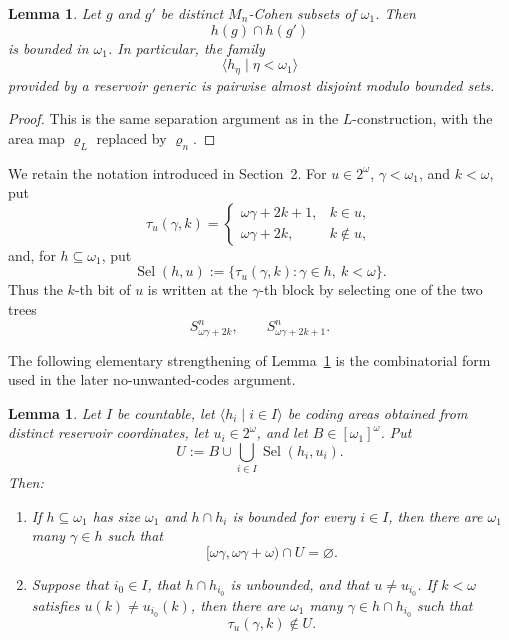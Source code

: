 \documentclass[a4paper,11pt]{article}
\newtheorem{lemma}[theorem]{Lemma}
\begin{document}
\begin{lemma}
\label{lemma-separation-Mn-coding-areas}
Let $g$ and $g'$ be distinct $M_n$-Cohen subsets of $\omega_1$.  Then
\[
   h(g)\cap h(g')
\]
is bounded in $\omega_1$.  In particular, the family
\[
   \langle h_\eta\mid\eta<\omega_1\rangle
\]
provided by a reservoir generic is pairwise almost disjoint modulo bounded
sets.
\end{lemma}


\begin{proof}
This is the same separation argument as in the $L$-construction, with the
area map $\varrho_L$ replaced by $\varrho_n$.  
\end{proof}

We retain the notation introduced in Section~2.  For $u\in2^\omega$,
$\gamma<\omega_1$, and $k<\omega$, put
\[
   \tau_u(\gamma,k)=
   \begin{cases}
      \omega\gamma+2k+1,&k\in u,\\
      \omega\gamma+2k,&k\notin u,
   \end{cases}
\]
and, for $h\subseteq\omega_1$, put
\[
   \operatorname{Sel}(h,u)
   :=\{\tau_u(\gamma,k):\gamma\in h,\ k<\omega\}.
\]
Thus the $k$-th bit of $u$ is written at the $\gamma$-th block by selecting
one of the two trees
\[
   S^n_{\omega\gamma+2k},
   \qquad
   S^n_{\omega\gamma+2k+1}.
\]

The following elementary strengthening of
Lemma~\ref{lemma-separation-Mn-coding-areas} is the combinatorial form used in
the later no-unwanted-codes argument.

\begin{lemma}
\label{lemma-countably-many-Mn-coding-areas}
Let $I$ be countable, let
$\langle h_i\mid i\in I\rangle$ be coding areas obtained from distinct
reservoir coordinates, let $u_i\in2^\omega$, and let
$B\in[\omega_1]^\omega$.  Put
\[
   U:=B\cup\bigcup_{i\in I}\operatorname{Sel}(h_i,u_i).
\]
Then:
\begin{enumerate}
   \item If $h\subseteq\omega_1$ has size $\omega_1$ and
         $h\cap h_i$ is bounded for every $i\in I$, then there are
         $\omega_1$ many $\gamma\in h$ such that
         \[
            [\omega\gamma,\omega\gamma+\omega)\cap U=\varnothing.
         \]

   \item Suppose that $i_0\in I$, that $h\cap h_{i_0}$ is unbounded, and
         that $u\neq u_{i_0}$.  If $k<\omega$ satisfies
         $u(k)\neq u_{i_0}(k)$, then there are $\omega_1$ many
         $\gamma\in h\cap h_{i_0}$ such that
         \[
            \tau_u(\gamma,k)\notin U.
         \]
\end{enumerate}
\end{lemma}
\end{document}
